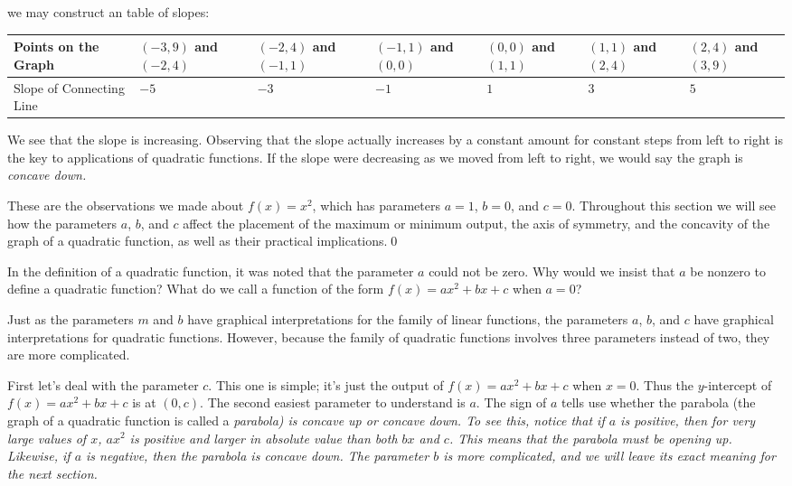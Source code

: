 \begin{eg}
\begin{itemize}
we may construct an table of slopes:

\begin{center}
\begin{tabular}{|p{1in}||p{.5in}|p{.5in}|p{.5in}|p{.5in}|p{.5in}|p{.5in}|}
\hline Points on the Graph & $(-3,9)$ and $(-2,4)$ & $(-2,4)$ and $(-1,1)$ & $(-1,1)$ and $(0,0)$ & $(0,0)$ and $(1,1)$ & $(1,1)$ and $(2,4)$ & $(2,4)$ and $(3,9)$ \\
\hline Slope of Connecting Line & $-5$ & $-3$ & $-1$ & $1$ & $3$ & $5$\\
\hline
\end{tabular}
\end{center}

We see that the slope is increasing. Observing that the slope actually increases by a constant amount for constant steps from left to right is the key to applications of quadratic functions. If the slope were decreasing as we moved from left to right, we would say the graph is \it{concave down}.\normalfont
\end{itemize}

These are the observations we made about $f(x) = x^2$, which has parameters $a=1$, $b=0$, and $c=0$. Throughout this section we will see how the parameters $a$, $b$, and $c$ affect the placement of the maximum or minimum output, the axis of symmetry, and the concavity of the graph of a quadratic function, as well as their practical implications.\qed \end{eg}

\par

\begin{question} In the definition of a quadratic function, it was noted that the parameter $a$ could not be zero. Why would we insist that $a$ be nonzero to define a quadratic function? What do we call a function of the form $f(x) = ax^2+bx+c$ when $a=0$?
\end{question}

\par

Just as the parameters $m$ and $b$ have graphical interpretations for the family of linear functions, the parameters $a$, $b$, and $c$ have graphical  interpretations for quadratic functions. However, because the family of quadratic functions involves three parameters instead of two, they are more complicated.

\par

First let's deal with the parameter $c$. This one is simple; it's just the output of $f(x) = ax^2+bx+c$ when $x=0$. Thus the $y$-intercept of $f(x) = ax^2+bx+c$ is at $(0,c)$. The second easiest parameter to understand is $a$. The sign of $a$ tells use whether the parabola (the graph of a quadratic function is called a \it{parabola}\normalfont) is concave up or concave down. To see this, notice that if $a$ is positive, then for very large values of $x$, $ax^2$ is positive and larger in absolute value than both $bx$ and $c$. This means that the parabola must be opening up. Likewise, if $a$ is negative, then the parabola is concave down. The parameter $b$ is more complicated, and we will leave its exact meaning for the next section.


